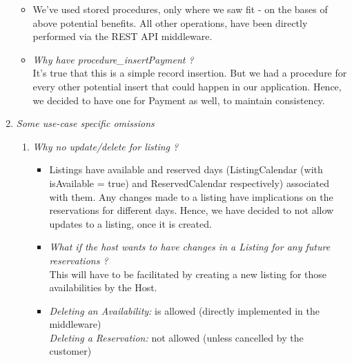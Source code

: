 \documentclass[conference]{IEEEtran}
\begin{document}
\begin{enumerate}
            \begin{itemize}
                \item We’ve used stored procedures, only where we saw fit - on the bases of above potential benefits. All other operations, have been directly performed via the REST API middleware.
                \vspace{1mm}
                \item \textit{Why have procedure\_insertPayment ?}\\
                    It’s true that this is a simple record insertion. But we had a procedure for every other potential insert that could happen in our application. Hence, we decided to have one for Payment as well, to maintain consistency.
            \end{itemize}

	    \item \textit{Some use-case specific omissions} \label{sec_someUsecaseSpecificOmissions}
	        \begin{enumerate}
	            \item \textit{Why no update/delete for listing ?}
	                \begin{itemize}
    	                    \item Listings have available and reserved days (ListingCalendar (with isAvailable = true) and ReservedCalendar respectively) associated with them. Any changes made to a listing have implications on the reservations for different days. Hence, we have decided to not allow updates to a listing, once it is created.

    	                    \vspace{1mm}

    	                    \item \textit{What if the host wants to have changes in a Listing for any future reservations ?}\\
    	                        This will have to be facilitated by creating a new listing for those availabilities \textrightarrow  by the Host.

    	                    \vspace{1mm}

    	                    \item \textit{Deleting an Availability: } is allowed  (directly implemented in the middleware)\\
    	                            \textit{Deleting a Reservation: } not allowed (unless cancelled by the customer)


\end{itemize}
\end{enumerate}
\end{enumerate}
\end{document}
